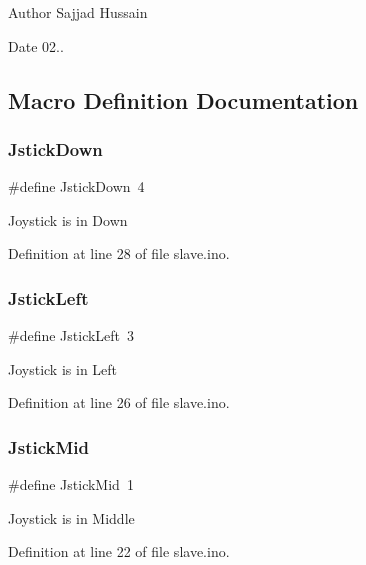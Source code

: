 \begin{DoxyAuthor}{Author}
Sajjad Hussain
\end{DoxyAuthor}
\begin{DoxyDate}{Date}
02.. 
\end{DoxyDate}


\subsection{Macro Definition Documentation}
\mbox{\label{slave_8ino_acc8a88b497450472b81c5f95b9c3a605}} 
\subsubsection{\texorpdfstring{JstickDown}{JstickDown}}
{\footnotesize\ttfamily \#define Jstick\+Down~4}

Joystick is in Down 

Definition at line 28 of file slave.\+ino.

\mbox{\label{slave_8ino_ad0d7429c7c26609751ca64fa94acb32c}} 
\subsubsection{\texorpdfstring{JstickLeft}{JstickLeft}}
{\footnotesize\ttfamily \#define Jstick\+Left~3}

Joystick is in Left 

Definition at line 26 of file slave.\+ino.

\mbox{\label{slave_8ino_ac4a0d1542e118f06f6f0997629d9ab84}} 
\subsubsection{\texorpdfstring{JstickMid}{JstickMid}}
{\footnotesize\ttfamily \#define Jstick\+Mid~1}

Joystick is in Middle 

Definition at line 22 of file slave.\+ino.

\mbox{\label{slave_8ino_a9b93a0effb9c09248bcba85a28c48b8d}} 
